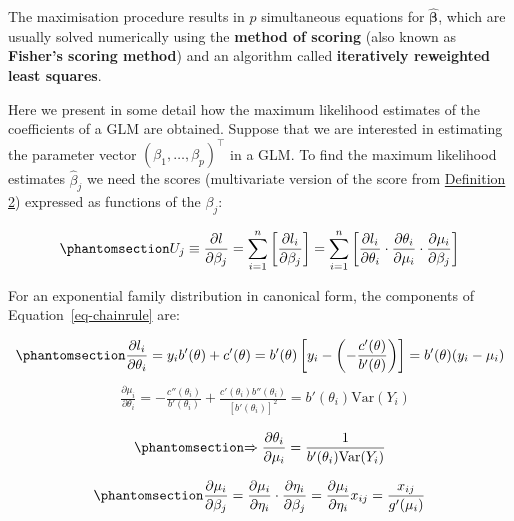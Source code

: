 \documentclass[
  a4paper,
  DIV=11,
  numbers=noendperiod]{scrreprt}
\newcommand{\term}[1]{\textbf{#1}}
\newenvironment{fbxSimple}[3]{\begin{tcolorbox}[enhanced, breakable,%
attach boxed title to top*={xshift=1.4pt},
boxed title style={boxrule=0.0mm, fuzzy shadow={1pt}{-1pt}{0mm}{0.1mm}{gray}, arc=.3em, rounded corners=east, sharp corners=west}, colframe=#1-color2, colbacktitle=#1-color1, colback = white, coltitle=black,  titlerule=0mm, toprule=0pt, bottomrule=.7pt, leftrule=.3em, rightrule=.7pt, outer arc=.3em,  	left=.5em, right=.5em, bottomtitle=1mm, toptitle=1mm,title=\textbf{#2}\hspace{0.5em}{#3}]}
{\end{tcolorbox}}
\begin{document}
The maximisation procedure results in \(p\) simultaneous equations for
\(\hat{\boldsymbol{\beta}}\), which are usually solved numerically using
the \term{method of scoring} (also known as \term{Fisher's scoring
method}) and an algorithm called \term{iteratively reweighted least
squares}.

\label{Supplement-1}
\begin{fbxSimple}{Supplement}{Supplement 1}{}
\label{Supplement-1}
Here we present in some detail how the maximum likelihood estimates of
the coefficients of a GLM are obtained. Suppose that we are interested
in estimating the parameter vector
\((\beta_1,\dots, \beta_p)^\intercal\) in a GLM. To find the maximum
likelihood estimates \(\hat{\beta}_j\) we need the scores (multivariate
version of the score from \hyperref[rdefscoreuniv]{Definition 2})
expressed as functions of the \(\beta_j\):

\begin{equation}\phantomsection\label{eq-chainrule}{
U_j\equiv \frac{\partial l}{\partial \beta_j} = \sum_{i=1}^n \left [   \frac{\partial l_i}{\partial \beta_j}  \right]= \sum_{i=1}^n \left [   \frac{\partial l_i}{\partial \theta_i} \cdot \frac{\partial \theta_i}{\partial \mu_i} \cdot \frac{\partial \mu_i} {\partial \beta_j}  \right]
}\end{equation}

For an exponential family distribution in canonical form, the components
of Equation~\ref{eq-chainrule} are:

\begin{equation}\phantomsection\label{eq-dldtheta}{
\frac{\partial l_i}{\partial \theta_i} = y_i b'(\theta) +c'(\theta)=b'(\theta) \left[y_i -\left(-\frac{c'(\theta)}{b'(\theta)}\right) \right]=b' (\theta) (y_i - \mu_i) 
}\end{equation} \[
\begin{aligned}
& \frac{\partial \mu_i}{\partial \theta_i} = -\frac{c''(\theta_i)}{b'(\theta_i)}+\frac{c'(\theta_i) b''(\theta_i)}{[b'(\theta_i)]^2} = b'(\theta_i) \mathrm{Var}(Y_i)  \nonumber \\
\end{aligned}
\] \begin{equation}\phantomsection\label{eq-dmudtheta}{
\Rightarrow  \frac{\partial \theta_i}{\partial \mu_i}= \frac{1}{b'(\theta_i) \mathrm{Var}(Y_i)} 
}\end{equation}

\begin{equation}\phantomsection\label{eq-dmudbeta}{
\frac{\partial \mu_i}{\partial \beta_j}=\frac{\partial \mu_i}{\partial \eta_i}\cdot \frac{\partial \eta_i}{\partial \beta_j}=\frac{\partial \mu_i}{\partial \eta_i}x_{ij}=\frac{x_{ij}}{g'(\mu_i)}
}\end{equation}


\end{fbxSimple}
\end{document}
